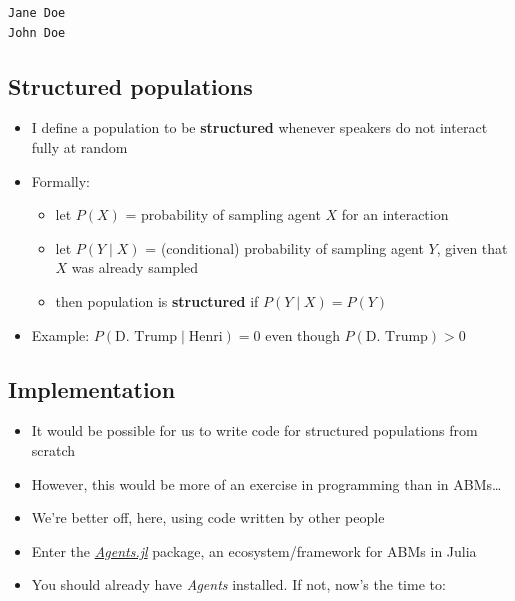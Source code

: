 \documentclass[
  letterpaper,
  DIV=11,
  numbers=noendperiod]{scrartcl}
\providecommand{\tightlist}{%
  \setlength{\itemsep}{0pt}\setlength{\parskip}{0pt}}\usepackage{longtable,booktabs,array}
\begin{document}
\begin{verbatim}
Jane Doe
John Doe
\end{verbatim}

\subsection{Structured populations}\label{structured-populations}

\begin{itemize}
\tightlist
\item
  I define a population to be \textbf{structured} whenever speakers do
  not interact fully at random
\end{itemize}

\begin{itemize}
\tightlist
\item
  Formally:

  \begin{itemize}
  \tightlist
  \item
    let \(P(X)\) = probability of sampling agent \(X\) for an
    interaction
  \item
    let \(P(Y \mid X)\) = (conditional) probability of sampling agent
    \(Y\), given that \(X\) was already sampled
  \item
    then population is \textbf{structured} if \(P(Y \mid X) = P(Y)\)
  \end{itemize}
\end{itemize}

\begin{itemize}
\tightlist
\item
  Example: \(P(\text{D. Trump} \mid \text{Henri}) = 0\) even though
  \(P(\text{D. Trump}) > 0\)
\end{itemize}

\subsection{Implementation}\label{implementation}

\begin{itemize}
\tightlist
\item
  It would be possible for us to write code for structured populations
  from scratch
\item
  However, this would be more of an exercise in programming than in
  ABMs\ldots{}
\item
  We're better off, here, using code written by other people
\item
  Enter the
  \href{https://juliadynamics.github.io/Agents.jl/stable/}{\emph{Agents.jl}}
  package, an ecosystem/framework for ABMs in Julia
\item
  You should already have \emph{Agents} installed. If not, now's the
  time to:
\end{itemize}
\end{document}
